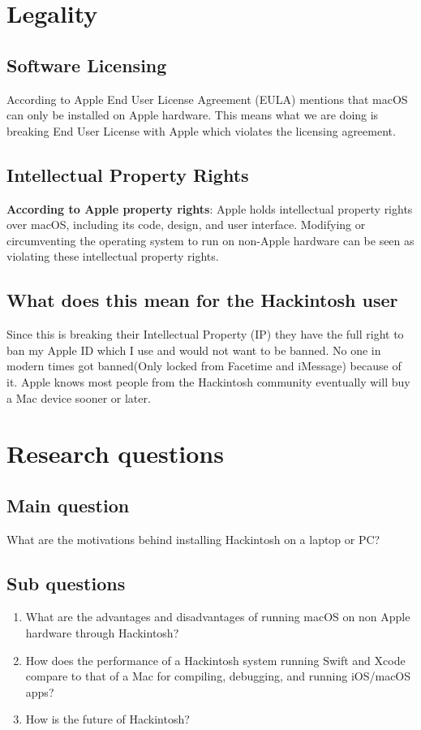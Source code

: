 \documentclass[12pt, letterpaper]{article}
\begin{document}
\section{Legality}
\subsection{Software Licensing}
According to Apple End User License Agreement (EULA) mentions that macOS can only be installed on Apple hardware. This means what we are doing is breaking End User License with Apple which violates the licensing agreement.

\subsection{Intellectual Property Rights}
\textbf{According to Apple property rights}: Apple holds intellectual property rights over macOS, including its code, design, and user interface. Modifying or circumventing the operating system to run on non-Apple hardware can be seen as violating these intellectual property rights.

\subsection{What does this mean for the Hackintosh user}
Since this is breaking their Intellectual Property (IP) they have the full right to ban my Apple ID which I use and would not want to be banned. No one in modern times got banned(Only locked from Facetime and iMessage) because of it. Apple knows most people from the Hackintosh community eventually will buy a Mac device sooner or later.

\newpage
\section{Research questions}

\subsection{Main question}
What are the  motivations behind installing Hackintosh on a laptop or PC?

\subsection{Sub questions}
\begin{enumerate}
    \item What are the advantages and disadvantages of running macOS on non Apple hardware through Hackintosh?
    \item How does the performance of a Hackintosh system running Swift and Xcode compare to that of a Mac for compiling, debugging, and running iOS/macOS apps?
    \item How is the future of Hackintosh?
\end{enumerate}
\end{document}
